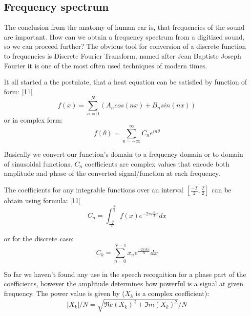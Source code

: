 \documentclass[12pt,a4paper,english]{article}
\begin{document}
\newpage
\subsection{Frequency spectrum}

The conclusion from the anatomy of human ear is, that frequencies of the sound are important.
How can we obtain a frequency spectrum from a digitized sound, so we can proceed further? \newline
The obvious tool for conversion of a discrete function to frequencies is Discrete Fourier Transform, named after Jean Baptiste Joseph Fourier it is one of the most often used techniques of modern times. \newline

It all started a the postulate, that a heat equation can be satisfied by function of form: [11] \newline
\begin{equation}
    f(x)=\sum_{n=0}^N(A_n cos(nx) + B_n sin(nx))
\end{equation}
or in complex form:
\begin{equation}
    f(\theta)=\sum_{n=-\infty}^{\infty} C_n e^{i n \theta}
\end{equation}

Basically we convert our function's domain to a frequency domain or to domain of sinusoidal functions. $C_n$ coefficients are complex values that encode both amplitude and phase of the converted signal/function at each frequency. \newline

The coefficients for any integrable functions over an interval $[\frac{-T}{2}, \frac{T}{2}]$ can be obtain using formula: [11] \newline
\begin{equation}
    C_n=\int_{\frac{-T}{2}}^{\frac{T}{2}} f(x) e^{-2 \pi i \frac{n}{T} x} dx
\end{equation}

or for the discrete case:
\begin{equation}
    C_k=\sum_{n=0}^{N-1} x_n e^{\frac{-2 \pi i k n}{N}} dx
\end{equation}
	

So far we haven't found any use in the speech recognition for a phase part of the coefficients, however the amplitude determines how powerful is a signal at given frequency. The power value is given by ($X_k$ is a complex coefficient):
\begin{equation}
    |X_k|/N = \sqrt{\Re e(X_k)^2 + \Im m(X_k)^2} / N
\end{equation}
\end{document}
